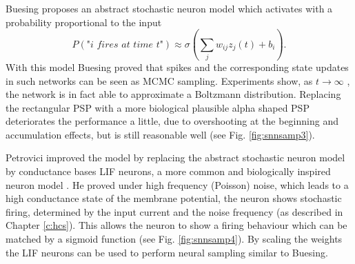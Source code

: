 Buesing proposes an abstract stochastic neuron model which activates with a probability proportional to the input
\[
P(\textit{"i fires at time t"}) \approx \sigma(\sum_j w_{ij} z_j(t) + b_i).
\]
With this model Buesing proved that spikes and the corresponding state updates in such networks can be seen as MCMC sampling. Experiments show, as $t \rightarrow \infty$ , the network is in fact able to approximate a Boltzmann distribution.
Replacing the rectangular PSP with a more biological plausible alpha shaped PSP deteriorates the performance a little, due to overshooting at the beginning and accumulation effects, but is still reasonable well (see Fig. \ref{fig:snnsamp3}).

Petrovici improved the model by replacing the abstract stochastic neuron model by conductance bases LIF neurons, a more common and biologically inspired neuron model \cite{Petrovici2016}.
He proved under high frequency (Poisson) noise, which leads to a high conductance state of the membrane potential, the neuron shows stochastic firing, determined by the input current and the noise frequency (as described in Chapter \ref{c:hcs}).
This allows the neuron to show a firing behaviour which can be matched by a sigmoid function (see Fig. \ref{fig:snnsamp4}).  
By scaling the weights the LIF neurons can be used to perform neural sampling similar to Buesing.

